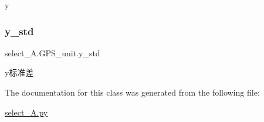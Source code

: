 y 

\mbox{\label{classselect___a_1_1_g_p_s__unit_ae32815d6ce5a57a6b1b66438c4c8d5dc}} 
\subsubsection{\texorpdfstring{y\+\_\+std}{y\_std}}
{\footnotesize\ttfamily select\+\_\+\+A.\+G\+P\+S\+\_\+unit.\+y\+\_\+std}



y标准差 



The documentation for this class was generated from the following file\+:\begin{DoxyCompactItemize}
\item 
\hyperlink{select___a_8py}{select\+\_\+\+A.\+py}\end{DoxyCompactItemize}
